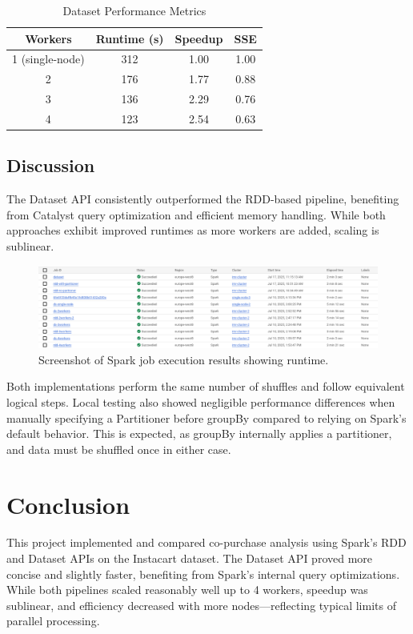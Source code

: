 \documentclass[sigconf,nonacm]{acmart}
\begin{document}
\begin{table}[h]
  \centering
  \caption{Dataset Performance Metrics}
  \begin{tabular}{cccc}
    \toprule
    \textbf{Workers} & \textbf{Runtime (s)} & \textbf{Speedup} & \textbf{SSE} \\
    \midrule
    1 (single-node) & 312 & 1.00 & 1.00 \\
    2 & 176 & 1.77 & 0.88 \\
    3 & 136 & 2.29 & 0.76 \\
    4 & 123 & 2.54 & 0.63 \\
    \bottomrule
  \end{tabular}
\end{table}

\subsection{Discussion}
The Dataset API consistently outperformed the RDD-based pipeline, benefiting from Catalyst query optimization and efficient memory handling. While both approaches exhibit improved runtimes as more workers are added, scaling is sublinear.

\begin{figure}[h]
  \centering
  \includegraphics[width=\linewidth]{figs/dataproc-history.png}
  \caption{Screenshot of Spark job execution results showing runtime.}
  \label{fig:job-results}
\end{figure}


Both implementations perform the same number of shuffles and follow equivalent logical steps. Local testing also showed negligible performance differences when manually specifying a Partitioner before groupBy compared to relying on Spark's default behavior. This is expected, as groupBy internally applies a partitioner, and data must be shuffled once in either case.


\section{Conclusion}
This project implemented and compared co-purchase analysis using Spark’s RDD and Dataset APIs on the Instacart dataset. The Dataset API proved more concise and slightly faster, benefiting from Spark’s internal query optimizations. While both pipelines scaled reasonably well up to 4 workers, speedup was sublinear, and efficiency decreased with more nodes—reflecting typical limits of parallel processing.
\end{document}
